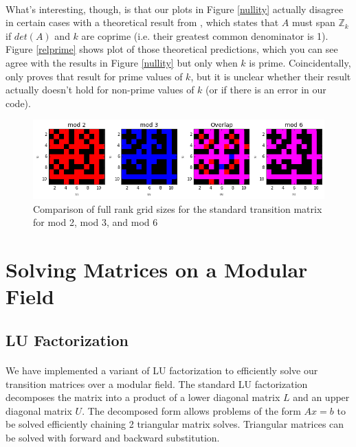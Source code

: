 \documentclass[11pt]{article}
\begin{document}
\paragraph{} What's interesting, though, is that our plots in Figure \ref{nullity} actually disagree in certain cases with a theoretical result from \cite{involve}, which states that $A$ must span $\mathbb{Z}_k$ if $det(A)$ and $k$ are coprime (i.e. their greatest common denominator is 1). Figure \ref{relprime} shows plot of those theoretical predictions, which you can see agree with the results in Figure \ref{nullity} but only when $k$ is prime. Coincidentally, \cite{involve} only proves that result for prime values of $k$, but it is unclear whether their result actually doesn't hold for non-prime values of $k$ (or if there is an error in our code).

\begin{figure}
\caption{Comparison of full rank grid sizes for the standard transition matrix for mod 2, mod 3, and mod 6}
\label{overlap236}
\includegraphics[width=\textwidth]{mod6overlap.png}
\end{figure}


\section*{Solving Matrices on a Modular Field}

\subsection*{LU Factorization}

\paragraph{} We have implemented a variant of LU factorization to efficiently solve our transition matrices over a modular field.  The standard LU factorization decomposes the matrix into a product of a lower diagonal matrix $L$ and an upper diagonal matrix $U$.  The decomposed form allows problems of the form $Ax = b$ to be solved efficiently chaining 2 triangular matrix solves.  Triangular matrices can be solved with forward and backward substitution.
\end{document}
